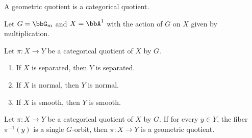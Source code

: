     \begin{proposition}\label{prop:geometric_quotient_is_categorical_quotient}
        A geometric quotient is a categorical quotient.
    \end{proposition}

    \begin{example}\label{eg:G_m_acting_on_A^1_has_no_geometric_quotient}
        Let \(G = \bbG_m\) and \(X = \bbA^1\) with the action of \(G\) on \(X\) given by multiplication.
    \end{example}



    \begin{proposition}\label{prop:descend_properties_to_categorical_quotient}
        Let \(\pi: X \to Y\) be a categorical quotient of \(X\) by \(G\).
        \begin{enumerate}
            \item If \(X\) is separated, then \(Y\) is separated.
            \item If \(X\) is normal, then \(Y\) is normal.
            \item If \(X\) is smooth, then \(Y\) is smooth.
        \end{enumerate}
    \end{proposition}

    \begin{proposition}\label{prop:fiber_is_single_orbit_implies_geometric_quotient}
        Let \(\pi: X \to Y\) be a categorical quotient of \(X\) by \(G\).
        If for every \(y \in Y\), the fiber \(\pi^{-1}(y)\) is a single \(G\)-orbit, then \(\pi: X \to Y\) is a geometric quotient.
    \end{proposition}
